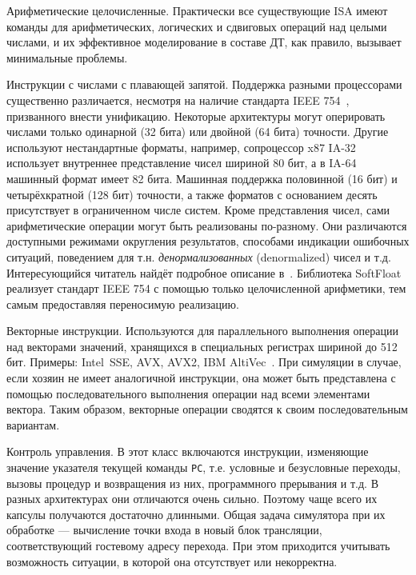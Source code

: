 \begin{description*}
    \item[Арифметические целочисленные.] Практически все существующие ISA имеют команды для арифметических, логических и сдвиговых операций над целыми числами, и их эффективное моделирование в составе ДТ, как правило, вызывает минимальные проблемы.
    
    \item[Инструкции с числами с плавающей запятой.] Поддержка разными процессорами существенно различается, несмотря на наличие стандарта IEEE 754~\cite{ieee754}, призванного внести унификацию. Некоторые архитектуры могут оперировать числами только одинарной (32 бита) или двойной (64 бита) точности. Другие используют нестандартные форматы, например, сопроцессор x87 IA-32 использует внутреннее представление чисел шириной 80 бит, а в IA-64 машинный формат имеет 82 бита. Машинная поддержка половинной (16 бит) и четырёхкратной (128 бит) точности, а также форматов с основанием десять присутствует в ограниченном числе систем.
    Кроме представления чисел, сами арифметические операции могут быть реализованы по-разному. Они различаются доступными режимами округления результатов, способами индикации ошибочных ситуаций, поведением для т.н. \textit{денормализованных} (\abbr denormalized) чисел и т.д. Интересующийся читатель найдёт подробное описание в~\cite{MullerEtAl2010}. Библиотека SoftFloat~\cite{softfloat} реализует стандарт IEEE 754 с помощью только целочисленной арифметики, тем самым предоставляя переносимую реализацию.
    
    \item[Векторные инструкции.] Используются для параллельного выполнения операции над векторами значений, хранящихся в специальных регистрах шириной до 512 бит. Примеры: Intel\textregistered~SSE, AVX, AVX2, IBM AltiVec~\cite{altivec}. При симуляции в случае, если хозяин не имеет аналогичной инструкции, она может быть представлена с помощью последовательного выполнения операции над всеми элементами вектора. Таким образом, векторные операции сводятся к своим последовательным вариантам.
    
    \item[Контроль управления.] В этот класс включаются инструкции, изменяющие значение указателя текущей команды \texttt{PC}, т.е. условные и безусловные переходы, вызовы процедур и возвращения из них, программного прерывания и т.д. В разных архитектурах они отличаются очень сильно. Поэтому чаще всего их капсулы получаются достаточно длинными. Общая задача симулятора при их обработке --- вычисление точки входа в новый блок трансляции, соответствующий гостевому адресу перехода. При этом приходится учитывать возможность ситуации, в которой она отсутствует или некорректна. %
    

\end{description*}

